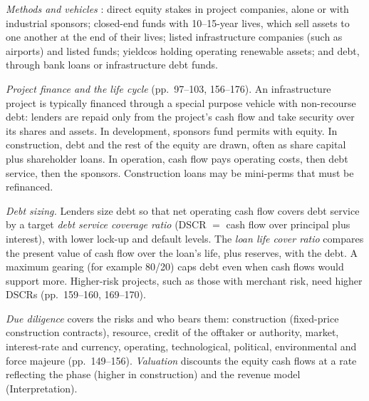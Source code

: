 \begin{qfmethod}\label{meth:infrastructure-underwriting}
 \emph{Methods and vehicles} \citep[pp.~117--131]{larreur-structured-finance-2021}: direct equity stakes in project companies, alone or with industrial sponsors; closed-end funds with 10--15-year lives, which sell assets to one another at the end of their lives; listed infrastructure companies (such as airports) and listed funds; yieldcos holding operating renewable assets; and debt, through bank loans or infrastructure debt funds.

\emph{Project finance and the life cycle} (pp.~97--103, 156--176). An infrastructure project is typically financed through a special purpose vehicle with non-recourse debt: lenders are repaid only from the project's cash flow and take security over its shares and assets. In development, sponsors fund permits with equity. In construction, debt and the rest of the equity are drawn, often as share capital plus shareholder loans. In operation, cash flow pays operating costs, then debt service, then the sponsors. Construction loans may be mini-perms that must be refinanced.

\emph{Debt sizing.} Lenders size debt so that net operating cash flow covers debt service by a target \emph{debt service coverage ratio} (DSCR $=$ cash flow over principal plus interest), with lower lock-up and default levels. The \emph{loan life cover ratio} compares the present value of cash flow over the loan's life, plus reserves, with the debt. A maximum gearing (for example 80/20) caps debt even when cash flows would support more. Higher-risk projects, such as those with merchant risk, need higher DSCRs (pp.~159--160, 169--170).

\emph{Due diligence} covers the risks and who bears them: construction (fixed-price construction contracts), resource, credit of the offtaker or authority, market, interest-rate and currency, operating, technological, political, environmental and force majeure (pp.~149--156). \emph{Valuation} discounts the equity cash flows at a rate reflecting the phase (higher in construction) and the revenue model (Interpretation).


\end{qfmethod}
